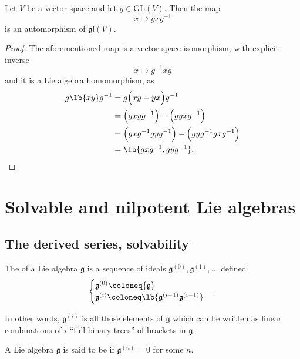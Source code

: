 \documentclass{article}
\DeclarePairedDelimiter\lb\lbrack\rbrack
\newcommand*\frkg{{\ensuremath{\mathfrak{g}}}}
\newcommand*\GL{\ensuremath{\text{GL}}}
\newcommand*\gl{\ensuremath{\mathfrak{gl}}}
\begin{document}
\begin{proposition}
    Let $V$ be a vector space and let $g \in \GL(V)$.
    Then the map
    \[
        x \mapsto gxg^{-1}
    \]
    is an automorphism of $\gl(V)$.
\end{proposition}
\begin{proof}
    The aforementioned map is a vector space isomorphism, with explicit inverse
    \[
        x \mapsto g^{-1}xg
    \]
    and it is a Lie algebra homomorphism, as
    \begin{align*}
        g\lb{xy}g^{-1}
        &=
        g\Big(xy - yx\Big)g^{-1}
        \\
        &=
        \Big(gxyg^{-1}\Big)
        -
        \Big(gyxg^{-1}\Big)
        \\
        &=
        \Big(gxg^{-1}gyg^{-1}\Big)
        -
        \Big(gyg^{-1}gxg^{-1}\Big)
        \\
        &=
        \lb{gxg^{-1},gyg^{-1}}.
    \end{align*}
\end{proof}

\section{
Solvable and nilpotent Lie algebras 
\texorpdfstring{\cite[\S 3]{Hum72}}{[Hum.\S 3]}
}

\subsection{The derived series, solvability}

\begin{definition}
    The  of a Lie algebra $\frkg$ is a sequence of ideals $\frkg^{(0)}, \frkg^{(1)}, \ldots$ defined
    \[
        \begin{cases}
            \frkg^{(0)} \coloneq \frkg \\
            \frkg^{(i)} \coloneq \lb{\frkg^{(i-1)}\frkg^{(i-1)}} \\
        \end{cases}.
    \]
\end{definition}

In other words, $\frkg^{(i)}$ is all those elements of $\frkg$ which can be written as linear combinations of $i$ ``full binary trees'' of brackets in $\frkg$.

\begin{definition}
    A Lie algebra $\frkg$ is said to be  if $\frkg^{(n)} = 0$ for some $n$.
\end{definition}
\end{document}

